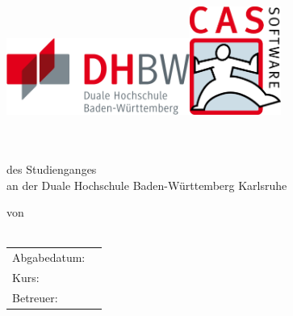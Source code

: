 
\newcommand{\logodhbw}{\includegraphics[width=6cm]{kapitel/offizielles/img/dhbw}}
\newcommand{\logocas}{\includegraphics[width=3cm]{kapitel/offizielles/img/cas}}

\begin{titlepage}
	\sffamily
	
	\logodhbw \hfill \logocas \\[2ex]
	
	\begin{center}
		\huge{\textsc{\textbf{\theTitle}}}
		\\[6ex]
		\Large{\textbf{\theSubtitle}}
		\\
		\Large{des Studienganges \studiengang}
		\\
		\Large{an der Duale Hochschule Baden-Württemberg Karlsruhe}
		\\[7ex]
		
		\normalsize{
			von
			\\
			\theAuthor
			\\[15ex]
			
			\begin{tabular}{ll}
				Abgabedatum:		& \quad \deadline \\
				Kurs:				& \quad \kurs \\ 
				Betreuer:			& \quad \supervisor \\
			\end{tabular}
		}
	\end{center}
\end{titlepage}